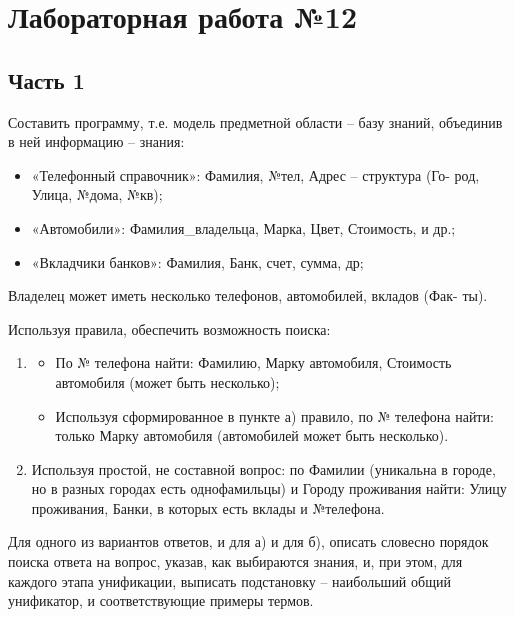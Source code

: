 \documentclass[12pt]{report}
\begin{document}
\chapter*{Лабораторная работа №12}

\section*{Часть 1}

Составить программу, т.е. модель предметной области – базу знаний, объединив в ней информацию – знания:
\begin{itemize}
	\item «Телефонный справочник»: Фамилия, №тел, Адрес – структура (Го-
	род, Улица, №дома, №кв);
	\item «Автомобили»: Фамилия\_владельца, Марка, Цвет, Стоимость, и др.;
	\item «Вкладчики банков»: Фамилия, Банк, счет, сумма, др;
\end{itemize} 

Владелец может иметь несколько телефонов, автомобилей, вкладов (Фак-
ты). 

Используя правила, обеспечить возможность поиска:
\begin{enumerate}
	\item \begin{itemize}
		\item По № телефона найти: Фамилию, Марку автомобиля, Стоимость
		автомобиля (может быть несколько);
		\item Используя сформированное в пункте а) правило, по № телефона найти: только Марку автомобиля (автомобилей может быть несколько).
	\end{itemize}
	\item Используя простой, не составной вопрос: по Фамилии (уникальна в
	городе, но в разных городах есть однофамильцы) и Городу проживания найти: Улицу проживания, Банки, в которых есть вклады и №телефона.
\end{enumerate}

Для одного из вариантов ответов, и для а) и для б), описать словесно
порядок поиска ответа на вопрос, указав, как выбираются знания, и, при
этом, для каждого этапа унификации, выписать подстановку – наибольший
общий унификатор, и соответствующие примеры термов.
\end{document}
